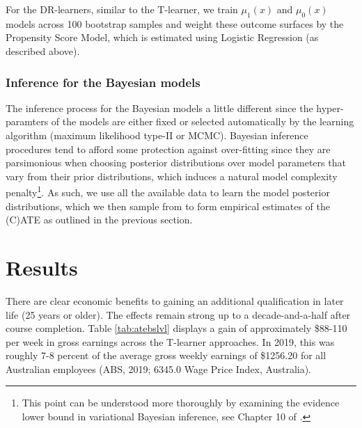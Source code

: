 \documentclass[12pt, a4paper]{article}
\begin{document}

For the DR-learners, similar to the T-learner, we train $\mu_1(x)$ and $\mu_0(x)$ models across 100 bootstrap samples and weight these outcome surfaces by the Propensity Score Model, which is estimated using Logistic Regression (as described above). 

\subsubsection*{Inference for the Bayesian models}

The inference process for the Bayesian models a little different since the
hyper-paramters of the models are either fixed or selected automatically by the
learning algorithm (maximum likelihood type-II or MCMC). Bayesian inference
procedures tend to afford some protection against over-fitting since they are
parsimonious when choosing posterior distributions over model parameters that
vary from their prior distributions, which induces a natural model complexity
penalty\footnote{This point can be understood more thoroughly by examining the
evidence lower bound in variational Bayesian inference, see Chapter 10 of
\citet{bishop2006}.}. As such, we use all the available data to learn the model
posterior distributions, which we then sample from to form empirical estimates
of the (C)ATE as outlined in the previous section. 


\section{Results}

There are clear economic benefits to gaining an additional qualification in later life (25 years or older). The effects remain strong up to a decade-and-a-half after course completion. Table \ref{tab:atebslvl} displays a gain of approximately \$88-110 per week in gross earnings across the T-learner approaches. In 2019, this was roughly 7-8 percent of the average gross weekly earnings of \$1256.20 for all Australian employees (ABS, 2019; 6345.0 Wage Price Index, Australia). 
\end{document}
